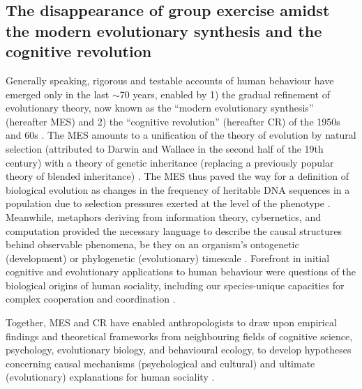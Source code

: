 \begin{CJK}{UTF8}{gbsn}
\subsection{The disappearance of group exercise amidst the modern evolutionary synthesis and the cognitive revolution}

Generally speaking, rigorous and testable accounts of human behaviour have emerged only in the last $\sim$70 years,  enabled by 1) the gradual refinement of evolutionary theory, now known as the ``modern evolutionary synthesis'' (hereafter MES) and 2) the ``cognitive revolution'' (hereafter CR) of the 1950s and 60s \citep{Fuentes2009}.  The MES amounts to a unification of the theory of evolution by natural selection (attributed to Darwin and Wallace in the second half of the 19th century) with a theory of genetic inheritance (replacing a previously popular theory of blended inheritance) \citep{Calcott2013}.  The MES thus paved the way for a definition of biological evolution as changes in the frequency of heritable DNA sequences in a population due to selection pressures exerted at the level of the phenotype \citep{Grafen1984}.  Meanwhile, metaphors deriving from information theory, cybernetics, and computation provided the necessary language to describe the causal structures behind observable phenomena, be they on an organism's ontogenetic (development) or phylogenetic (evolutionary) timescale \citep[refer, for example, to language of digital computation utilised by][]{Mayr1961}.  Forefront in initial cognitive and evolutionary applications to human behaviour were questions of the biological origins of human sociality, including our species-unique capacities for complex cooperation and coordination \citep{Wilson1975,Chomsky1956}.

Together, MES and CR have enabled anthropologists to draw upon empirical findings and theoretical frameworks from neighbouring fields of cognitive science, psychology, evolutionary biology, and behavioural ecology, to develop hypotheses concerning causal mechanisms (psychological and cultural) and ultimate (evolutionary) explanations for human sociality \cite[e.g.][; see Appendix ~\ref{app1:intro} Section ~\ref{sect:modernSynthesis} for a more detailed explanation of MS, CR, and their applications to human behaviour)]{Dawkins1976,Wilson1978,Sperber1996,Whitehouse2004,Dunbar1996}.


\end{CJK}
